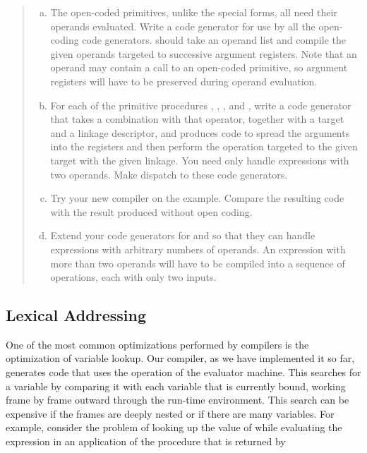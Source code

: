 \begin{quote}
\begin{enumerate}[a.]

\item
The open-coded primitives, unlike the special forms, all need their operands
evaluated.  Write a code generator  for use by all the
open-coding code generators.   should take an operand
list and compile the given operands targeted to successive argument registers.
Note that an operand may contain a call to an open-coded primitive, so argument
registers will have to be preserved during operand evaluation.

\item
For each of the primitive procedures \code{=}, \code{*}, \code{-}, and
\code{+}, write a code generator that takes a combination with that operator,
together with a target and a linkage descriptor, and produces code to spread
the arguments into the registers and then perform the operation targeted to the
given target with the given linkage.  You need only handle expressions with two
operands.  Make  dispatch to these code generators.

\item
Try your new compiler on the  example.  Compare the resulting
code with the result produced without open coding.

\item
Extend your code generators for \code{+} and \code{*} so that they can handle
expressions with arbitrary numbers of operands.  An expression with more than
two operands will have to be compiled into a sequence of operations, each with
only two inputs.

\end{enumerate}
\end{quote}

\subsection{Lexical Addressing}
\label{Section 5.5.6}

One of the most common optimizations performed by compilers is the optimization
of variable lookup.  Our compiler, as we have implemented it so far, generates
code that uses the  operation of the evaluator
machine.  This searches for a variable by comparing it with each variable that
is currently bound, working frame by frame outward through the run-time
environment.  This search can be expensive if the frames are deeply nested or
if there are many variables.  For example, consider the problem of looking up
the value of  while evaluating the expression  in an
application of the procedure that is returned by

